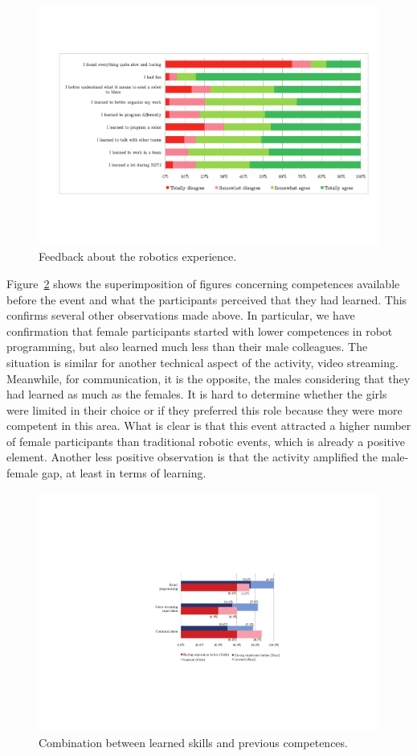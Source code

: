 \documentclass{intech-journal}
\begin{document}
\begin{figure}[ht]
 \centering
    \includegraphics[width=0.9\columnwidth]{figures/robotics.pdf}
  \caption{Feedback about the robotics experience.}
  \label{fig:robotics} 
\end{figure}

Figure~\ref{fig:learned} shows the superimposition of figures concerning competences available before the event and what the participants perceived that they had learned.
This confirms several other observations made above.
In particular, we have confirmation that female participants started with lower competences in robot programming, but also learned much less than their male colleagues. 
The situation is similar for another technical aspect of the activity, video streaming. 
Meanwhile, for communication, it is the opposite, the males considering that they had learned as much as the females. 
It is hard to determine whether the girls were limited in their choice or if they preferred this role because they were more competent in this area. 
What is clear is that this event attracted a higher number of female participants than traditional robotic events, which is already a positive element.
Another less positive observation is that the activity amplified the male-female gap, at least in terms of learning. 


\begin{figure}[ht]
 \centering
    \includegraphics[width=0.6\columnwidth]{figures/learned.pdf}
  \caption{Combination between learned skills and previous competences.}
  \label{fig:learned} 
\end{figure}
\end{document}
